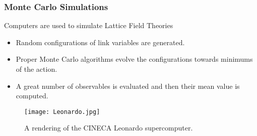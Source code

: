 \documentclass{beamer}
\begin{document}
\begin{frame}
  \frametitle{Monte Carlo Simulations}
  \centering
  Computers are used to simulate Lattice Field Theories
  \vspace{.5\baselineskip}
  \begin{itemize}
    \item<2-> Random configurations of link variables are generated.
    \item<3-> Proper Monte Carlo algorithms evolve the configurations towards minimums of the action.
    \item<4-> A great number of observables is evaluated and then their mean value is computed.
  \end{itemize}
  \vspace{.5\baselineskip}
  \begin{figure}[b]
    \texttt{[image: Leonardo.jpg]}
    \caption{A rendering of the CINECA Leonardo supercomputer\cite{LeonardoImg}.}
  \end{figure}
\end{frame}
\end{document}
